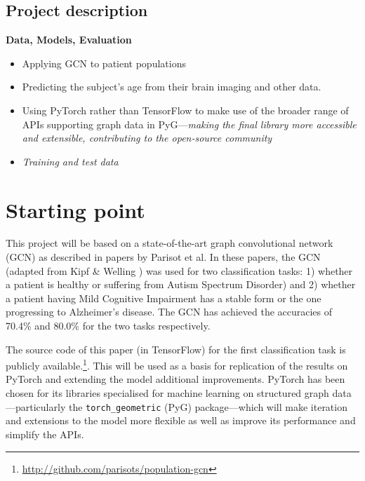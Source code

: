 \documentclass[12pt,a4paper,twoside]{article}
\begin{document}
\subsection*{Project description}
\textbf{Data, Models, Evaluation}

\begin{itemize}
  \item Applying GCN to patient populations
  \item Predicting the subject's age from their brain imaging and other data.
  \item Using PyTorch rather than TensorFlow to make use of the broader range of APIs supporting graph data in PyG—\textit{making the final library more accessible and extensible, contributing to the open-source community} %
  \item \textit{Training and test data}
\end{itemize}

\section*{Starting point}


This project will be based on a state-of-the-art graph convolutional network (GCN) as described in papers by Parisot et al. \cite{parisot2017spectral, parisot2018disease} In these papers, the GCN (adapted from Kipf \& Welling \cite{kipf2017semi}) was used for two classification tasks: 1) whether a patient is  healthy or suffering from Autism Spectrum Disorder) and 2) whether a patient having Mild Cognitive Impairment has a stable form or the one progressing to Alzheimer's disease. The GCN has achieved the accuracies of 70.4\% and 80.0\% for the two tasks respectively. 

The source code of this paper (in TensorFlow) for the first classification task is publicly available.\footnote{\url{http://github.com/parisots/population-gcn}}. This will be used as a basis for replication of the results on PyTorch and extending the model additional improvements. PyTorch has been chosen for its libraries specialised for machine learning on structured graph data—particularly the \texttt{torch\_geometric} (PyG) package—which will make iteration and extensions to the model more flexible as well as improve its performance and simplify the APIs.
\end{document}
